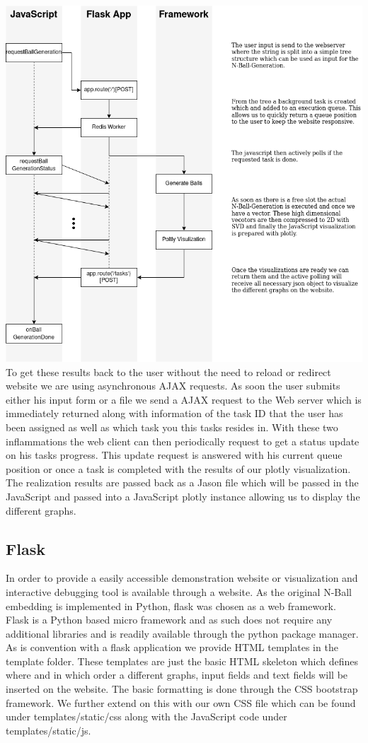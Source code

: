 \documentclass[]{article}
\begin{document}
\includegraphics[width=\textwidth]{res/overview.png}
To get these results back to the user without the need to reload or redirect website we are using asynchronous AJAX requests. As soon the user submits either his input form or a file we send a AJAX request to the Web server which is immediately returned along with information of the task ID that the user has been assigned as well as which task you this tasks resides in. With these two inflammations the web client can then periodically request to get a status update on his tasks progress. This update request is answered with his current queue position or once a task is completed with the results of our plotly visualization. The realization results are passed back as a Jason file which will be passed in the JavaScript and passed into a JavaScript plotly instance allowing us to display the different graphs.

\subsection{Flask}
\label{sec::flask}
In order to provide a easily accessible demonstration website or visualization and interactive debugging tool is available through a website. As the original N-Ball embedding is implemented in Python, flask was chosen as a web framework.  Flask is a Python based micro framework and as such does not require any additional libraries and is readily available through the python package manager. 
As is convention with a flask application we provide HTML templates in the template folder. These templates are just the basic HTML skeleton which defines where and in which order a different graphs, input fields and text fields will be inserted on the website. The basic formatting is done through the CSS bootstrap framework. We further extend on this with our own CSS file which can be found under templates/static/css along with the JavaScript code under templates/static/js. 
\end{document}
